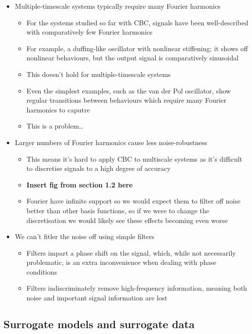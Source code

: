 \documentclass[11pt]{article}
\begin{document}
\begin{itemize}
\item Multiple-timescale systems typically require many Fourier harmonics
\begin{itemize}
\item For the systems studied so far with CBC, signals have been well-described with comparatively few Fourier harmonics
\item For example, a duffing-like oscillator with nonlinear stiffening; it shows off nonlinear behaviours, but the output signal is comparatively sinusoidal
\item This doesn't hold for multiple-timescale systems
\item Even the simplest examples, such as the van der Pol oscillator, show regular transitions between behaviours which require many Fourier harmonics to caputre
\item This is a problem\ldots{}
\end{itemize}

\item Larger numbers of Fourier harmonics cause less noise-robustness
\begin{itemize}
\item This means it's hard to apply CBC to multiscale systems as it's difficult to discretise signals to a high degree of accuracy
\item \textbf{Insert fig from section 1.2 here}
\item Fourier have infinite support so we would expect them to filter off noise better than other basis functions, so if we were to change the discretisation we would likely see these effects becoming even worse
\end{itemize}

\item We can't fitler the noise off using simple filters
\begin{itemize}
\item Filters impart a phase shift on the signal, which, while not necessarily problematic, is an extra inconvenience when dealing with phase conditions
\item Filters indiscriminately remove high-frequency information, meaning both noise and important signal information are lost
\end{itemize}
\end{itemize}


\subsection{Surrogate models and surrogate data}
\label{sec:org18900ce}
\end{document}
